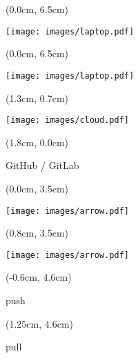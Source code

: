 \documentclass[aspectratio=169]{beamer}
\begin{document}
\begin{frame}{}

  \begin{textblock*}{5cm}(0.0cm, 6.5cm)
    \begin{center}
      \texttt{[image: images/laptop.pdf]}
    \end{center}
  \end{textblock*}
  
\end{frame}



\begin{frame}{}

  \begin{textblock*}{5cm}(0.0cm, 6.5cm)
    \begin{center}
      \texttt{[image: images/laptop.pdf]}
    \end{center}
  \end{textblock*}

  \begin{textblock*}{5cm}(1.3cm, 0.7cm)
    \begin{center}
      \texttt{[image: images/cloud.pdf]}
    \end{center}
  \end{textblock*}
  
  \begin{textblock*}{5cm}(1.8cm, 0.0cm)
    \begin{center}
      {\small GitHub / GitLab}
    \end{center}
  \end{textblock*}  

  \begin{textblock*}{5cm}(0.0cm, 3.5cm)
    \begin{center}
      \texttt{[image: images/arrow.pdf]}
    \end{center}
  \end{textblock*}

  \begin{textblock*}{5cm}(0.8cm, 3.5cm)
    \begin{center}
      \texttt{[image: images/arrow.pdf]}
    \end{center}
  \end{textblock*}
  
  \begin{textblock*}{5cm}(-0.6cm, 4.6cm)
    \begin{center}
      {\small push}
    \end{center}
  \end{textblock*}

  \begin{textblock*}{5cm}(1.25cm, 4.6cm)
    \begin{center}
      {\small pull}
    \end{center}
  \end{textblock*}    
  
\end{frame}
\end{document}
